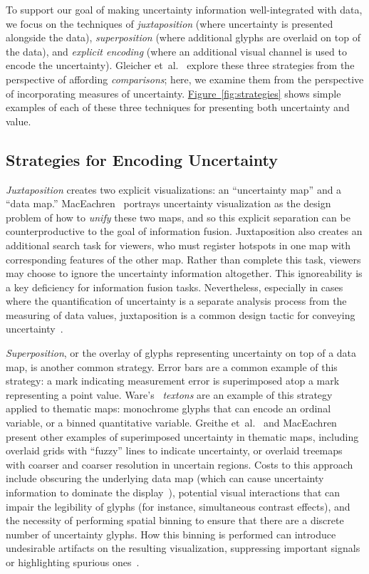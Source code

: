 \documentclass{vgtc}                          %
\newcommand{\figref}[1]{\hyperref[#1]{Figure~\ref*{#1}}}
\newcommand{\ea}{{et~al.}\xspace}
\begin{document}
\strategyFig

To support our goal of making uncertainty information well-integrated with data, we focus on the techniques of \emph{juxtaposition} (where uncertainty is presented alongside the data), \emph{superposition} (where additional glyphs are overlaid on top of the data), and \emph{explicit encoding} (where an additional visual channel is used to encode the uncertainty). Gleicher \ea~\cite{gleicher2011visual} explore these three strategies from the perspective of affording \emph{comparisons}; here, we examine them from the perspective of incorporating measures of uncertainty. \figref{fig:strategies} shows simple examples of each of these three techniques for presenting both uncertainty and value.

\subsection{Strategies for Encoding Uncertainty}

\emph{Juxtaposition} creates two explicit visualizations: an ``uncertainty map'' and a ``data map.'' MacEachren~\cite{maceachren1992visualizing} portrays uncertainty visualization as the design problem of how to \emph{unify} these two maps, and so this explicit separation can be counterproductive to the goal of information fusion. Juxtaposition also creates an additional search task for viewers, who must register hotspots in one map with corresponding features of the other map. Rather than complete this task, viewers may choose to ignore the uncertainty information altogether. This ignoreability is a key deficiency for information fusion tasks. Nevertheless, especially in cases where the quantification of uncertainty is a separate analysis process from the measuring of data values, juxtaposition is a common design tactic for conveying uncertainty~\cite{moritz2017trust}.

\emph{Superposition}, or the overlay of glyphs representing uncertainty on top of a data map, is another common strategy. Error bars are a common example of this strategy: a mark indicating measurement error is superimposed atop a mark representing a point value. Ware's~\cite{ware2009quantitative} \emph{textons} are an example of this strategy applied to thematic maps: monochrome glyphs that can encode an ordinal variable, or a binned quantitative variable. Greithe \ea~\cite{griethe2006visualization} and MacEachren~\cite{maceachren1992visualizing,maceachren1998visualizing} present other examples of superimposed uncertainty in thematic maps, including overlaid grids with ``fuzzy'' lines to indicate uncertainty, or overlaid treemaps with coarser and coarser resolution in uncertain regions. Costs to this approach include obscuring the underlying data map (which can cause uncertainty information to dominate the display~\cite{brodlie2012review}), potential visual interactions that can impair the legibility of glyphs (for instance, simultaneous contrast effects), and the necessity of performing spatial binning to ensure that there are a discrete number of uncertainty glyphs. How this binning is performed can introduce undesirable artifacts on the resulting visualization, suppressing important signals or highlighting spurious ones~\cite{battersby2016shapes}.
\end{document}
